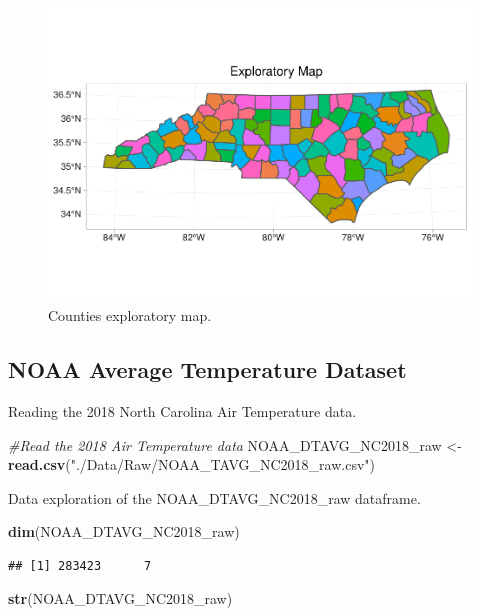 \documentclass[12pt,]{article}
\newenvironment{Shaded}{\begin{snugshade}}{\end{snugshade}}
\newcommand{\KeywordTok}[1]{\textcolor[rgb]{0.13,0.29,0.53}{\textbf{#1}}}
\newcommand{\StringTok}[1]{\textcolor[rgb]{0.31,0.60,0.02}{#1}}
\newcommand{\CommentTok}[1]{\textcolor[rgb]{0.56,0.35,0.01}{\textit{#1}}}
\newcommand{\NormalTok}[1]{#1}
\begin{document}
\begin{figure}
\centering
\includegraphics{./Outputunnamed-chunk-23-1.pdf}
\caption{Counties exploratory map. \label{Countyplot}}
\end{figure}

\subsection{NOAA Average Temperature
Dataset}\label{noaa-average-temperature-dataset-1}

Reading the 2018 North Carolina Air Temperature data.

\begin{Shaded}
\begin{Highlighting}[]
\CommentTok{#Read the 2018 Air Temperature data}
\NormalTok{NOAA_DTAVG_NC2018_raw <-}\StringTok{ }\KeywordTok{read.csv}\NormalTok{(}\StringTok{"./Data/Raw/NOAA_TAVG_NC2018_raw.csv"}\NormalTok{)}
\end{Highlighting}
\end{Shaded}

Data exploration of the NOAA\_DTAVG\_NC2018\_raw dataframe.

\begin{Shaded}
\begin{Highlighting}[]
\KeywordTok{dim}\NormalTok{(NOAA_DTAVG_NC2018_raw)}
\end{Highlighting}
\end{Shaded}

\begin{verbatim}
## [1] 283423      7
\end{verbatim}

\begin{Shaded}
\begin{Highlighting}[]
\KeywordTok{str}\NormalTok{(NOAA_DTAVG_NC2018_raw)}
\end{Highlighting}
\end{Shaded}
\end{document}
